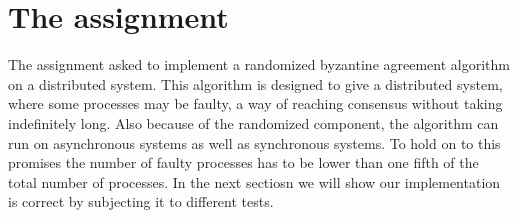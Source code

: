 \section{The assignment}

The assignment asked to implement a randomized byzantine agreement algorithm on a distributed system.
This algorithm is designed to give a distributed system, where some processes may be faulty, a way of reaching consensus without taking indefinitely long.
Also because of the randomized component, the algorithm can run on asynchronous systems as well as synchronous systems.
To hold on to this promises the number of faulty processes has to be lower than one fifth of the total number of processes. 
In the next sectiosn we will show our implementation is correct by subjecting it to different tests.
